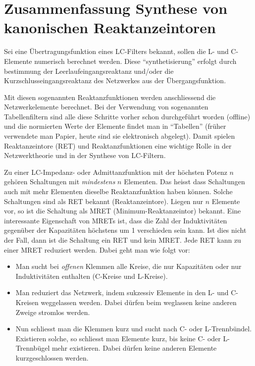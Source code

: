 \documentclass[notitlepage]{fhnwreport/fhnwreport}
\begin{document}
\section*{Zusammenfassung Synthese von kanonischen Reaktanzeintoren}

Sei eine  \"Ubertragungsfunktion  eines  LC-Filters bekannt, sollen die L- und
C-Elemente numerisch berechnet werden. Diese ``synthetisierung'' erfolgt durch
bestimmung        der       Leerlaufeingangsreaktanz       und/oder        die
Kurzschlusseingangsreaktanz  des  Netzwerkes  aus   der   \"Ubergangsfunktion.

Mit   diesen   sogenannten   Reaktanzfunktionen   werden   anschliessend   die
Netzwerkelemente berechnet. Bei der Verwendung von sogenannten Tabellenfiltern
sind alle diese Schritte vorher schon durchgef\"uhrt worden  (offline) und die
normierten Werte der Elemente findet  man in ``Tabellen'' (fr\"uher verwendete
man   Papier,   heute   sind   sie   elektronisch  abgelegt).  Damit   spielen
Reaktanzeintore  (RET)  und  Reaktanzfunktionen  eine  wichtige  Rolle  in der
Netzwerktheorie und in der Synthese von LC-Filtern.

Zu einer LC-Impedanz-  oder  Admittanzfunktion  mit  der h\"ochsten Potenz $n$
geh\"oren Schaltungen mit \textit{mindestens}  $n$  Elementen. Das heisst dass
Schaltungen auch mit mehr Elementen dieselbe  Reaktanzfunktion haben k\"onnen.
Solche Schaltungen sind als  RET  bekannt  (Reaktanzeintore).  Liegen  nur $n$
Elemente vor,  so ist die Schaltung als MRET (Minimum-Reaktanzeintor) bekannt.
Eine   interessante   Eigenschaft   von   MRETs   ist,   dass   die  Zahl  der
Induktivit\"aten gegen\"uber der  Kapazit\"aten  h\"ochstens  um 1 verschieden
sein kann. Ist dies  nicht  der  Fall, dann ist die Schaltung ein RET und kein
MRET. Jede RET kann zu einer MRET reduziert werden. Dabei geht  man  wie folgt
vor:

\begin{itemize}
\item  Man  sucht   bei   \textit{offenen}   Klemmen   alle  Kreise,  die  nur
Kapazit\"aten oder  nur  Induktivit\"aten  enthalten  (C-Kreise und L-Kreise).
\item Man reduziert das Netzwerk,  indem  sukzessiv  Elemente  in  den  L- und
C-Kreisen  weggelassen werden. Dabei d\"urfen  beim  weglassen  keine  anderen
Zweige stromlos werden.
\item   Nun   schliesst  man  die  Klemmen  kurz  und  sucht  nach   C-   oder
L-Trennb\"undel.  Existieren solche, so schliesst man Elemente kurz, bis keine
C- oder L-Trennb\"ugel mehr  existieren. Dabei d\"urfen keine anderen Elemente
kurzgeschlossen werden.
\end{itemize}
\end{document}
